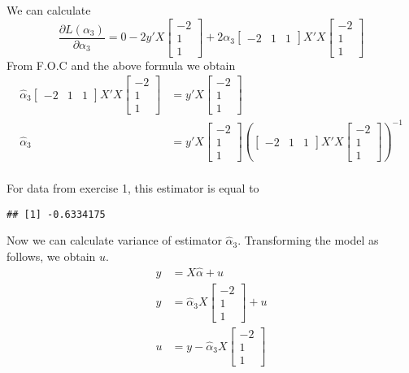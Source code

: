 \documentclass[12pt, a4paper]{article}\usepackage[]{graphicx}\usepackage[]{color}
\makeatletter
\newenvironment{kframe}{%
 \def\at@end@of@kframe{}%
 \ifinner\ifhmode%
  \def\at@end@of@kframe{\end{minipage}}%
  \begin{minipage}{\columnwidth}%
 \fi\fi%
 \def\FrameCommand##1{\hskip\@totalleftmargin \hskip-\fboxsep
 \colorbox{shadecolor}{##1}\hskip-\fboxsep
     \hskip-\linewidth \hskip-\@totalleftmargin \hskip\columnwidth}%
 \MakeFramed {\advance\hsize-\width
   \@totalleftmargin\z@ \linewidth\hsize
   \@setminipage}}%
 {\par\unskip\endMakeFramed%
 \at@end@of@kframe}
\newenvironment{knitrout}{}{} %
\makeatother
\begin{document}
We can calculate 
\[ \frac{\partial L(\alpha_3)}{\partial \alpha_3} = 
  0 - 2 y'X \begin{bmatrix} -2 \\ 1 \\ 1 \end{bmatrix} 
  + 2 \alpha_3 \begin{bmatrix} -2 & 1 & 1 \end{bmatrix} X'X \begin{bmatrix} -2 \\ 1 \\ 1 \end{bmatrix} 
\]
From F.O.C and the above formula we obtain 
\begin{align*}
  \hat{\alpha}_3 \begin{bmatrix} -2 & 1 & 1 \end{bmatrix} X'X \begin{bmatrix} -2 \\ 1 \\ 1 \end{bmatrix} 
  & = y'X \begin{bmatrix} -2 \\ 1 \\ 1 \end{bmatrix} \\
  \hat{\alpha}_3 & =
    y'X \begin{bmatrix} -2 \\ 1 \\ 1 \end{bmatrix} \left(\begin{bmatrix} -2 & 1 & 1 \end{bmatrix} X'X \begin{bmatrix} -2 \\ 1 \\ 1 \end{bmatrix} \right)^{-1}\\
\end{align*}

For data from exercise 1, this estimator is equal to
\begin{knitrout}
\color{fgcolor}\begin{kframe}
\begin{verbatim}
## [1] -0.6334175
\end{verbatim}
\end{kframe}
\end{knitrout}

Now we can calculate variance of estimator $\hat{\alpha}_3$. Transforming the model as follows, we obtain $u$.
\begin{align*}
y & = X\hat{\alpha} + u \\
y & = \hat{\alpha}_3 X \begin{bmatrix} -2 \\ 1 \\ 1 \end{bmatrix} + u \\
u & = y -  \hat{\alpha}_3 X \begin{bmatrix} -2 \\ 1 \\ 1 \end{bmatrix}
\end{align*}
\end{document}
